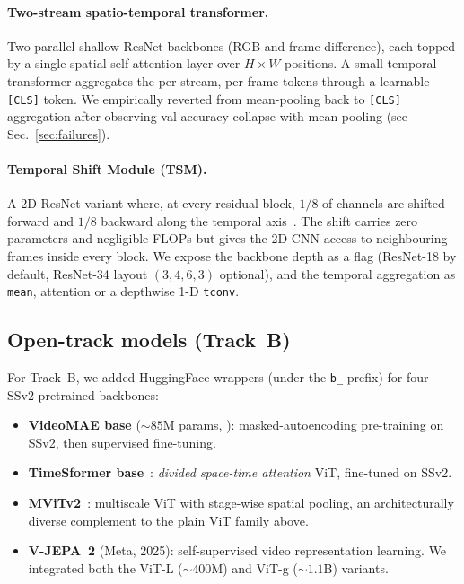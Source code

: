 \documentclass[10pt,twocolumn,letterpaper]{article}
\begin{document}
\paragraph{Two-stream spatio-temporal transformer.} Two parallel
shallow ResNet backbones (RGB and frame-difference), each topped by a
single spatial self-attention layer over $H\times W$ positions. A small
temporal transformer aggregates the per-stream, per-frame tokens through
a learnable \texttt{[CLS]} token. We empirically reverted from
mean-pooling back to \texttt{[CLS]} aggregation after observing val
accuracy collapse with mean pooling (see Sec.~\ref{sec:failures}).

\paragraph{Temporal Shift Module (TSM).} A 2D ResNet variant where, at
every residual block, $1/8$ of channels are shifted forward and $1/8$
backward along the temporal axis~\cite{Lin19tsm}. The shift carries
zero parameters and negligible FLOPs but gives the 2D CNN access to
neighbouring frames inside every block. We expose the backbone depth as
a flag (ResNet-18 by default, ResNet-34 layout $(3,4,6,3)$ optional),
and the temporal aggregation as \texttt{mean}, attention or a depthwise
1-D \texttt{tconv}.

\subsection{Open-track models (Track~B)}

For Track~B, we added HuggingFace wrappers (under the \texttt{b\_}
prefix) for four SSv2-pretrained backbones:

\begin{itemize}
    \item \textbf{VideoMAE base} ($\sim$$85$M params,
    \cite{Tong22videomae}): masked-autoencoding pre-training on SSv2,
    then supervised fine-tuning.
    \item \textbf{TimeSformer base}~\cite{Bertasius21timesformer}:
    \emph{divided space-time attention} ViT, fine-tuned on SSv2.
    \item \textbf{MViTv2}~\cite{Li22mvitv2}: multiscale ViT with
    stage-wise spatial pooling, an architecturally diverse complement
    to the plain ViT family above.
    \item \textbf{V-JEPA~2} (Meta, 2025): self-supervised video
    representation learning. We integrated both the ViT-L
    ($\sim$$400$M) and ViT-g ($\sim$$1.1$B) variants.
\end{itemize}
\end{document}
